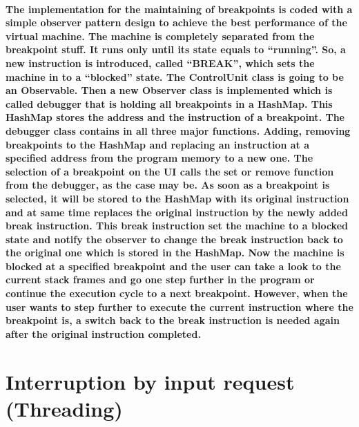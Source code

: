 \paragraph{The implementation for the maintaining of breakpoints is coded with a simple observer pattern design to achieve the best performance of the virtual machine. The machine is completely separated from the breakpoint stuff. It runs only until its state equals to “running”. So, a new instruction is introduced, called “BREAK”, which sets the machine in to a “blocked” state. The ControlUnit class is going to be an Observable. Then a new Observer class is implemented which is called debugger that is holding all breakpoints in a HashMap. This HashMap stores the address and the instruction of a breakpoint. The debugger class contains in all three major functions. Adding, removing breakpoints to the HashMap and replacing an instruction at a specified address from the program memory to a new one. The selection of a breakpoint on the UI calls the set or remove function from the debugger, as the case may be. As soon as a breakpoint is selected, it will be stored to the HashMap with its original instruction and at same time replaces the original instruction by the newly added break instruction. This break instruction set the machine to a blocked state and notify the observer to change the break instruction back to the original one which is stored in the HashMap. Now the machine is blocked at a specified breakpoint and the user can take a look to the current stack frames and go one step further in the program or continue the execution cycle to a next breakpoint. However, when the user wants to step further to execute the current instruction where the breakpoint is, a switch back to the break instruction is needed again after the original instruction completed.}
\section{Interruption by input request (Threading)}
